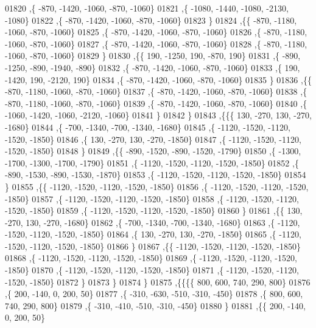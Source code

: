 \begin{DoxyCode}
01820     ,\{  -870, -1420, -1060,  -870, -1060\}
01821     ,\{ -1080, -1440, -1080, -2130, -1080\}
01822     ,\{  -870, -1420, -1060,  -870, -1060\}
01823     \}
01824    ,\{\{  -870, -1180, -1060,  -870, -1060\}
01825     ,\{  -870, -1420, -1060,  -870, -1060\}
01826     ,\{  -870, -1180, -1060,  -870, -1060\}
01827     ,\{  -870, -1420, -1060,  -870, -1060\}
01828     ,\{  -870, -1180, -1060,  -870, -1060\}
01829     \}
01830    ,\{\{   190, -1250,   190,  -870,   190\}
01831     ,\{  -890, -1250,  -890, -1940,  -890\}
01832     ,\{  -870, -1420, -1060,  -870, -1060\}
01833     ,\{   190, -1420,   190, -2120,   190\}
01834     ,\{  -870, -1420, -1060,  -870, -1060\}
01835     \}
01836    ,\{\{  -870, -1180, -1060,  -870, -1060\}
01837     ,\{  -870, -1420, -1060,  -870, -1060\}
01838     ,\{  -870, -1180, -1060,  -870, -1060\}
01839     ,\{  -870, -1420, -1060,  -870, -1060\}
01840     ,\{ -1060, -1420, -1060, -2120, -1060\}
01841     \}
01842    \}
01843   ,\{\{\{   130,  -270,   130,  -270, -1680\}
01844     ,\{  -700, -1340,  -700, -1340, -1680\}
01845     ,\{ -1120, -1520, -1120, -1520, -1850\}
01846     ,\{   130,  -270,   130,  -270, -1850\}
01847     ,\{ -1120, -1520, -1120, -1520, -1850\}
01848     \}
01849    ,\{\{  -890, -1520,  -890, -1520, -1790\}
01850     ,\{ -1300, -1700, -1300, -1700, -1790\}
01851     ,\{ -1120, -1520, -1120, -1520, -1850\}
01852     ,\{  -890, -1530,  -890, -1530, -1870\}
01853     ,\{ -1120, -1520, -1120, -1520, -1850\}
01854     \}
01855    ,\{\{ -1120, -1520, -1120, -1520, -1850\}
01856     ,\{ -1120, -1520, -1120, -1520, -1850\}
01857     ,\{ -1120, -1520, -1120, -1520, -1850\}
01858     ,\{ -1120, -1520, -1120, -1520, -1850\}
01859     ,\{ -1120, -1520, -1120, -1520, -1850\}
01860     \}
01861    ,\{\{   130,  -270,   130,  -270, -1680\}
01862     ,\{  -700, -1340,  -700, -1340, -1680\}
01863     ,\{ -1120, -1520, -1120, -1520, -1850\}
01864     ,\{   130,  -270,   130,  -270, -1850\}
01865     ,\{ -1120, -1520, -1120, -1520, -1850\}
01866     \}
01867    ,\{\{ -1120, -1520, -1120, -1520, -1850\}
01868     ,\{ -1120, -1520, -1120, -1520, -1850\}
01869     ,\{ -1120, -1520, -1120, -1520, -1850\}
01870     ,\{ -1120, -1520, -1120, -1520, -1850\}
01871     ,\{ -1120, -1520, -1120, -1520, -1850\}
01872     \}
01873    \}
01874   \}
01875  ,\{\{\{\{   800,   600,   740,   290,   800\}
01876     ,\{   200,  -140,     0,   200,    50\}
01877     ,\{  -310,  -630,  -510,  -310,  -450\}
01878     ,\{   800,   600,   740,   290,   800\}
01879     ,\{  -310,  -410,  -510,  -310,  -450\}
01880     \}
01881    ,\{\{   200,  -140,     0,   200,    50\}

\end{DoxyCode}
